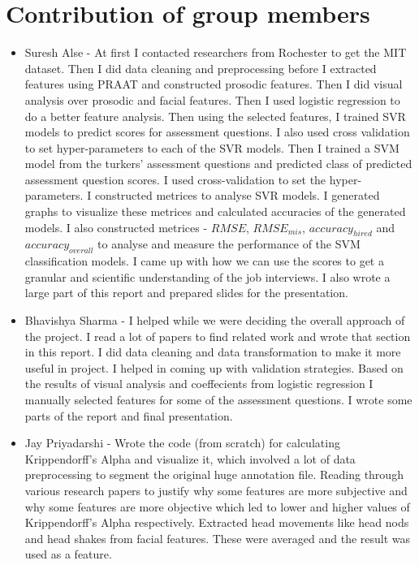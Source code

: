 \documentclass[11pt]{article}
\begin{document}
\section{Contribution of group members}
\begin{itemize}
 \item Suresh Alse - At first I contacted researchers from Rochester to get the MIT dataset. Then I did data cleaning and preprocessing before I extracted features using PRAAT and constructed prosodic features. Then I did visual analysis over prosodic and facial features. Then I used logistic regression to do a better feature analysis. Then using the selected features, I trained SVR models to predict scores for assessment questions. I also used cross validation to set hyper-parameters to each of the SVR models. Then I trained a SVM model from the turkers' assessment questions and predicted class of predicted assessment question scores. I used cross-validation to set the hyper-parameters. I constructed metrices to analyse SVR models. I generated graphs to visualize these metrices and calculated accuracies of the generated models. I also constructed metrices - $RMSE$, $RMSE_{mis}$, $accuracy_{hired}$ and $accuracy_{overall}$ to analyse and measure the performance of the SVM classification models. I came up with how we can use the scores to get a granular and scientific understanding of the job interviews. I also wrote a large part of this report and prepared slides for the presentation.
 
 \item Bhavishya Sharma - I helped while we were deciding the overall approach of the project. I read a lot of papers to find related work and wrote that section in this report. I did data cleaning and data transformation to make it more useful in project. I helped in coming up with validation strategies. Based on the results of visual analysis and coeffecients from logistic regression I manually selected features for some of the assessment questions. I wrote some parts of the report and final presentation.
 
 \item Jay Priyadarshi -  Wrote the code (from scratch) for calculating Krippendorff's Alpha and visualize it, which involved a lot of data preprocessing to segment the original huge annotation file. Reading through various research papers to justify why some features are more subjective and why some features are more objective which led to lower and higher values of Krippendorff’s Alpha respectively. Extracted head movements like head nods and head shakes from facial features. These were averaged and the result was used as a feature.
 

\end{itemize}
\end{document}
